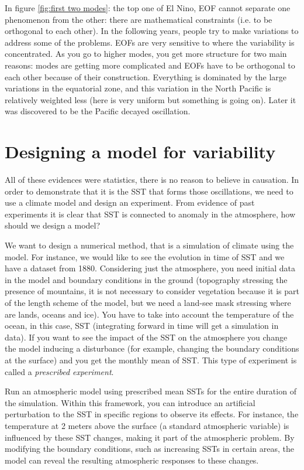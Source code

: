 In figure \ref{fig:first two modes}: the top one of El Nino, EOF cannot separate one phenomenon from the other: there are mathematical constraints (i.e. to be orthogonal to each other). In the following  years, people try to make variations to address some of the problems. EOFs are very sensitive to where the variability is concentrated. As you go to higher modes, you get more structure for two main reasons: modes are getting more complicated and EOFs have to be orthogonal to each other because of their construction. Everything is dominated by the large variations in the equatorial zone, and this variation in the North Pacific is relatively weighted less (here is very uniform but something is going on). Later it was discovered to be the Pacific decayed oscillation. 

\section{Designing a model for variability}
All of these evidences were statistics, there is no reason to believe in causation. In order to demonstrate that it is the SST that forms those oscillations, we need to use a climate model and design an experiment. 
From evidence of past experiments it is clear that SST is connected to anomaly in the atmosphere, how should we design a model? 

We want to design a numerical method, that is a  simulation of climate using the model. 
For instance, we would like to see the evolution in time of SST and we have a dataset from 1880. 
Considering just the atmosphere, you need initial data in the model and boundary conditions in the ground (topography stressing the presence of mountains, it is not necessary to consider vegetation because it is part of the length scheme of the model, but we need a land-see mask stressing where are lands, oceans and ice). You have to take into account the temperature of the ocean, in this case, SST (integrating forward in time will get a simulation in data). If you want to see the impact of the SST on the atmosphere you change the model inducing a disturbance (for example, changing the boundary conditions at the surface) and you get the monthly mean of SST. This type of experiment is called a \textit{prescribed experiment}.


Run an atmospheric model using prescribed mean SSTs for the entire duration of the simulation. Within this framework, you can introduce an artificial perturbation to the SST in specific regions to observe its effects. For instance, the temperature at 2 meters above the surface (a standard atmospheric variable) is influenced by these SST changes, making it part of the atmospheric problem. By modifying the boundary conditions, such as increasing SSTs in certain areas, the model can reveal the resulting atmospheric responses to these changes.



